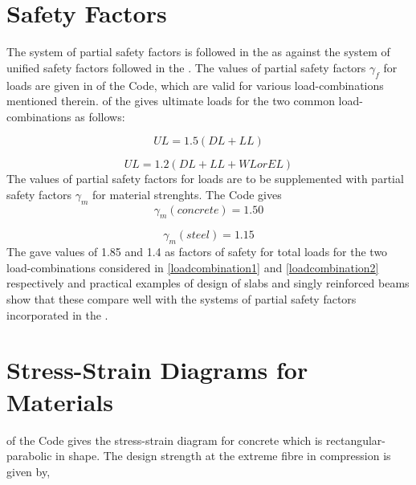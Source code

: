 \section{Safety Factors}

The system of partial safety factors is followed in the
 as against the system of uniﬁed safety factors
followed in the . The values of partial safety
factors ${\gamma_f}$ for loads are given in  of the Code, which
are valid for various load-combinations mentioned therein. 
of the  gives ultimate loads for the two common
load-combinations as follows:

\begin{equation}
UL = 1.5 (DL + LL)
\label{loadcombination1}
\end{equation}

\begin{equation}
UL = 1.2 (DL + LL + WL or EL)
\label{loadcombination2}
\end{equation}
The values of partial safety factors for loads are to be supplemented
with partial safety factors $\gamma_m$ for material strenghts. The Code gives           
\begin{equation}
\gamma_m (concrete) = 1.50
\label{SaftyFactorConcrete1}
\end{equation}

\begin{equation}
\gamma_m (steel) = 1.15 
\label{SaftyFactorConcrete2}
\end{equation}
The  gave values of 1.85 and 1.4 as factors of
safety for total loads for the two load-combinations considered in
\eqn \ref{loadcombination1} and \eqn \ref{loadcombination2} respectively
and practical examples of design of slabs and singly reinforced beams
show that these compare well with the systems of partial safety factors
incorporated in the .

\section{Stress-Strain Diagrams for Materials}

 of the Code gives the stress-strain diagram for concrete which
is rectangular-parabolic in shape. The design strength at the extreme
fibre in compression is given by,

